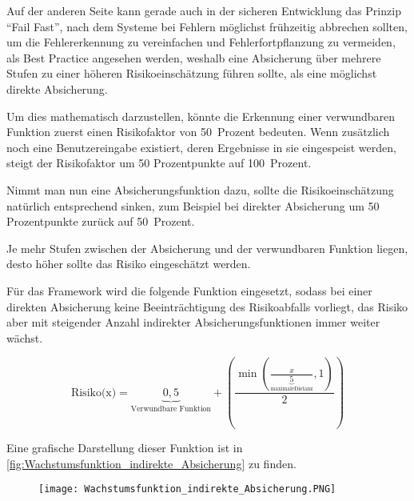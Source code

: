                 Auf der anderen Seite kann gerade auch in der sicheren Entwicklung das Prinzip
                \foreignquote{english}{Fail Fast},
                nach dem Systeme bei Fehlern möglichst frühzeitig abbrechen sollten,
                um die Fehlererkennung zu vereinfachen und
                Fehlerfortpflanzung zu vermeiden,\cite{Shore2004}
                als Best Practice angesehen werden,
                weshalb eine Absicherung über mehrere Stufen zu einer höheren Risikoeinschätzung führen sollte,
                als eine möglichst direkte Absicherung.

                Um dies mathematisch darzustellen,
                könnte die Erkennung einer verwundbaren Funktion zuerst einen Risikofaktor von 50~Prozent bedeuten.
                Wenn zusätzlich noch eine Benutzereingabe existiert,
                deren Ergebnisse in sie eingespeist werden,
                steigt der Risikofaktor um 50 Prozentpunkte auf 100~Prozent.

                Nimmt man nun eine Absicherungsfunktion dazu,
                sollte die Risikoeinschätzung natürlich entsprechend sinken,
                zum Beispiel bei direkter Absicherung um 50 Prozentpunkte zurück auf 50~Prozent.

                Je mehr Stufen zwischen der Absicherung und
                der verwundbaren Funktion liegen,
                desto höher sollte das Risiko eingeschätzt werden.

                Für das Framework wird die folgende Funktion eingesetzt,
                sodass bei einer direkten Absicherung keine Beeinträchtigung des Risikoabfalls vorliegt,
                das Risiko aber mit steigender Anzahl indirekter Absicherungsfunktionen immer weiter wächst.

                \[ \textrm{Risiko(x)} =
                    \underbrace{0,5}_\textrm{Verwundbare Funktion} +
                    \left(\frac{
                        \min{\left(\frac{x}
                            {\underbrace{5}_\mathrm{maximale Distanz}}, 1\right)}
                        }
                        {2}\right)
                \]

                Eine grafische Darstellung dieser Funktion ist in
                \vref{fig:Wachstumsfunktion_indirekte_Absicherung} zu finden.

                \begin{figure}[htp]
                    \centering%
                    \texttt{[image: Wachstumsfunktion\_indirekte\_Absicherung.PNG]}
                    \label{fig:Wachstumsfunktion_indirekte_Absicherung}
                \end{figure}

